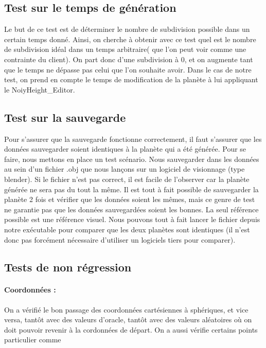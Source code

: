 \documentclass[a4paper]{article}
\begin{document}

\subsection{Test sur le temps de génération}

Le but de ce test est de déterminer le nombre de subdivision possible dans un certain temps donné. Ainsi, on cherche à obtenir avec ce test quel est le nombre de subdivision idéal dans un temps arbitraire( que l'on peut voir comme une contrainte du client). On part donc d'une subdivision à 0, et on augmente tant que le temps ne dépasse pas celui que l'on souhaite avoir. Dans le cas de notre test, on prend en compte le temps de modification de la planète à lui appliquant le NoiyHeight\_Editor.

\subsection{Test sur la sauvegarde}

Pour s'assurer que la sauvegarde fonctionne correctement, il faut s'assurer que les données sauvegarder soient identiques à la planète qui a été générée. Pour se faire, nous mettons en place un test scénario. Nous sauvegarder dans les données au sein d'un fichier .obj que nous lançons sur un logiciel de visionnage (type blender). Si le fichier n'est pas correct, il est facile de l'observer car la planète générée ne sera pas du tout la même. Il est tout à fait possible de sauvegarder la planète 2 fois et vérifier que les données soient les mêmes, mais ce genre de test ne garantie pas que les données sauvegardées soient les bonnes. La seul référence possible est une référence visuel. Nous pouvons tout à fait lancer le fichier depuis notre exécutable pour comparer que les deux planètes sont identiques (il n'est donc pas forcément nécessaire d'utiliser un logiciels tiers pour comparer).

\subsection{Tests de non régression}

\paragraph{Coordonnées : } On a vérifié le bon passage des coordonnées cartésiennes à sphériques, et vice versa, tantôt avec des valeurs d'oracle, tantôt avec des valeurs aléatoires où on doit pouvoir revenir à la cordonnées de départ.
On a aussi vérifie certains points particulier comme 
\end{document}
